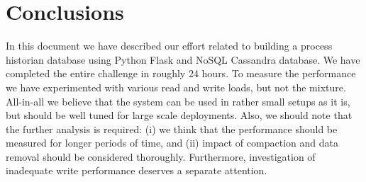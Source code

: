 \section{Conclusions}
\label{section:conclusion}

In this document we have described our effort related to building a 
process historian database using Python Flask and NoSQL Cassandra
database. We have completed the entire challenge in roughly 24
hours. To measure the performance we have experimented with various
read and write loads, but not the mixture. All-in-all we believe 
that the system can be used in rather small setups as it is,
but should be well tuned for large scale deployments. Also, we should
note that the further analysis is required: (i) we think that the performance
should be measured for longer periods of time, and (ii) impact of compaction and 
data removal should be considered thoroughly. Furthermore, investigation of 
inadequate write performance deserves a separate attention.

